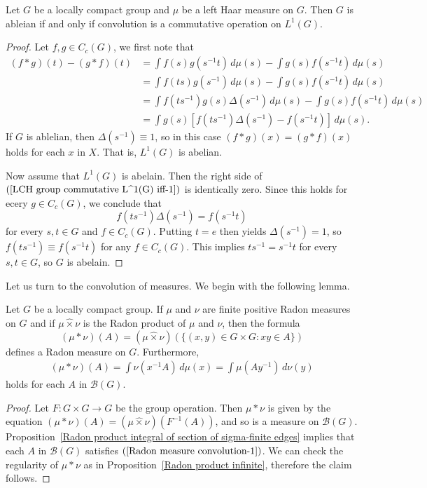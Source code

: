 \begin{proposition}\label{LCH group commutative L^1(G) iff}
Let $G$ be a locally compact group and $\mu$ be a left Haar measure on $G$. Then $G$ is ableian if and only if convolution is a commutative
operation on $L^1(G)$.
\end{proposition}
\begin{proof}
Let $f,g\in C_c(G)$, we first note that
\begin{equation}\label{LCH group commutative L^1(G) iff-1}
\begin{aligned}
(f\ast g)(t)-(g\ast f)(t)&=\int f(s)g(s^{-1}t)\,d\mu(s)-\int g(s)f(s^{-1}t)\,d\mu(s)\\
&=\int f(ts)g(s^{-1})\,d\mu(s)-\int g(s)f(s^{-1}t)\,d\mu(s)\\
&=\int f(ts^{-1})g(s)\Delta(s^{-1})\,d\mu(s)-\int g(s)f(s^{-1}t)\,d\mu(s)\\
&=\int g(s)[f(ts^{-1})\Delta(s^{-1})-f(s^{-1}t)]\,d\mu(s).
\end{aligned}
\end{equation}
If $G$ is ablelian, then $\Delta(s^{-1})\equiv 1$, so in this case $(f\ast g)(x)=(g\ast f)(x)$ holds for each $x$ in $X$. That is, $L^1(G)$ is abelian.\par
Now assume that $L^1(G)$ is abelain. Then the right side of $(\ref{LCH group commutative L^1(G) iff-1})$ is identically zero. Since this holds for ecery $g\in C_c(G)$, we conclude that 
\[f(ts^{-1})\Delta(s^{-1})=f(s^{-1}t)\]
for every $s,t\in G$ and $f\in C_c(G)$. Putting $t=e$ then yields $\Delta(s^{-1})=1$, so $f(ts^{-1})\equiv f(s^{-1}t)$ for any $f\in C_c(G)$. This implies $ts^{-1}=s^{-1}t$ for every $s,t\in G$, so $G$ is abelain.
\end{proof}
Let us turn to the convolution of measures. We begin with the following lemma.
\begin{lemma}
Let $G$ be a locally compact group. If $\mu$ and $\nu$ are finite positive Radon measures on $G$ and if $\mu\hat{\times}\nu$ is the Radon product of $\mu$ and $\nu$, then the formula
\[(\mu\ast\nu)(A)=(\mu\hat{\times}\nu)(\{(x,y)\in G\times G:xy\in A\})\]
defines a Radon measure on $G$. Furthermore,
\begin{align}\label{Radon measure convolution-1}
(\mu\ast\nu)(A)=\int\nu(x^{-1}A)\,d\mu(x)=\int\mu(Ay^{-1})\,d\nu(y)
\end{align}
holds for each $A$ in $\mathcal{B}(G)$.
\end{lemma}
\begin{proof}
Let $F:G\times G\to G$ be the group operation. Then $\mu\ast\nu$ is given by the equation $(\mu\ast\nu)(A)=(\mu\hat{\times}\nu)(F^{-1}(A))$, and so is a measure on $\mathcal{B}(G)$. Proposition~\ref{Radon product integral of section of sigma-finite edges} implies that each $A$ in $\mathcal{B}(G)$ satisfies $(\ref{Radon measure convolution-1})$. We can check the regularity of $\mu\ast\nu$ as in Proposition~\ref{Radon product infinite}, therefore the claim follows.
\end{proof}
